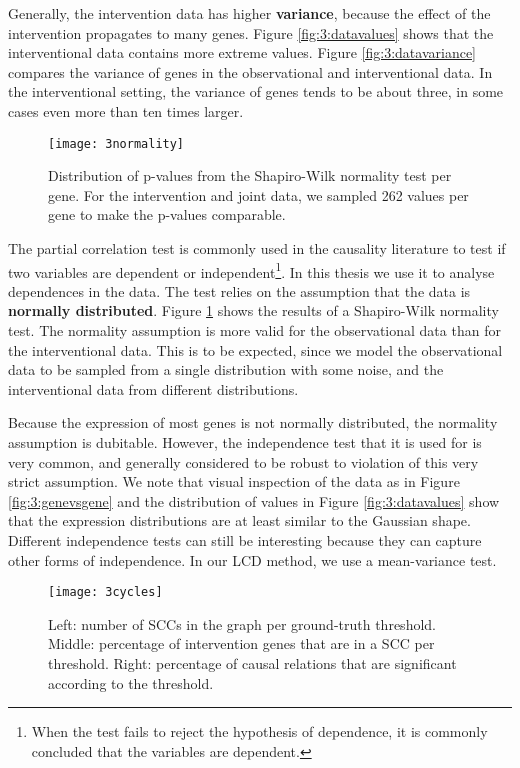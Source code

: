 Generally, the intervention data has higher \textbf{variance}, because the effect of the intervention propagates to many genes. Figure \ref{fig:3:datavalues} shows that the interventional data contains more extreme values. Figure \ref{fig:3:datavariance} compares the variance of genes in the observational and interventional data. In the interventional setting, the variance of genes tends to be about three, in some cases even more than ten times larger.

\begin{figure}[h]
    \centering
    \texttt{[image: 3normality]}
    \caption{Distribution of p-values from the Shapiro-Wilk normality test per gene. For the intervention and joint data, we sampled 262 values per gene to make the p-values comparable.}
    \label{fig:3:normality}
\end{figure}   

The partial correlation test is commonly used in the causality literature to test if two variables are dependent or independent\footnote{When the test fails to reject the hypothesis of dependence, it is commonly concluded that the variables are dependent.}. In this thesis we use it to analyse dependences in the data. The test relies on the assumption that the data is \textbf{normally distributed}. Figure \ref{fig:3:normality} shows the results of a Shapiro-Wilk normality test. The normality assumption is more valid for the observational data than for the interventional data. This is to be expected, since we model the observational data to be sampled from a single distribution with some noise, and the interventional data from different distributions. 

Because the expression of most genes is not normally distributed, the normality assumption is dubitable. However, the independence test that it is used for is very common, and generally considered to be robust to violation of this very strict assumption. We note that visual inspection of the data as in Figure \ref{fig:3:genevsgene} and the distribution of values in Figure \ref{fig:3:datavalues} show that the expression distributions are at least similar to the Gaussian shape. Different independence tests can still be interesting because they can capture other forms of independence. In our LCD method, we use a mean-variance test.

\begin{figure}[h]
    \centering
    \texttt{[image: 3cycles]}
    \caption{Left: number of SCCs in the graph per ground-truth threshold. Middle: percentage of intervention genes that are in a SCC per threshold. Right: percentage of causal relations that are significant according to the threshold.}
    \label{fig:3:cycles}
\end{figure}

